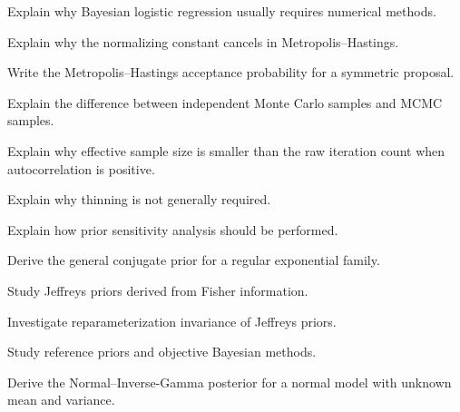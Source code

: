 \begin{exercise}[3]
Explain why Bayesian logistic regression usually requires numerical
methods.
\end{exercise}

\begin{exercise}[3]
Explain why the normalizing constant cancels in Metropolis--Hastings.
\end{exercise}

\begin{exercise}[3]
Write the Metropolis--Hastings acceptance probability for a symmetric
proposal.
\end{exercise}

\begin{exercise}[3]
Explain the difference between independent Monte Carlo samples and MCMC
samples.
\end{exercise}

\begin{exercise}[3]
Explain why effective sample size is smaller than the raw iteration count
when autocorrelation is positive.
\end{exercise}

\begin{exercise}[3]
Explain why thinning is not generally required.
\end{exercise}

\begin{exercise}[3]
Explain how prior sensitivity analysis should be performed.
\end{exercise}

\begin{exercise}[4]
Derive the general conjugate prior for a regular exponential family.
\end{exercise}

\begin{exercise}[4]
Study Jeffreys priors derived from Fisher information.
\end{exercise}

\begin{exercise}[4]
Investigate reparameterization invariance of Jeffreys priors.
\end{exercise}

\begin{exercise}[4]
Study reference priors and objective Bayesian methods.
\end{exercise}

\begin{exercise}[4]
Derive the Normal--Inverse-Gamma posterior for a normal model with unknown
mean and variance.
\end{exercise}

